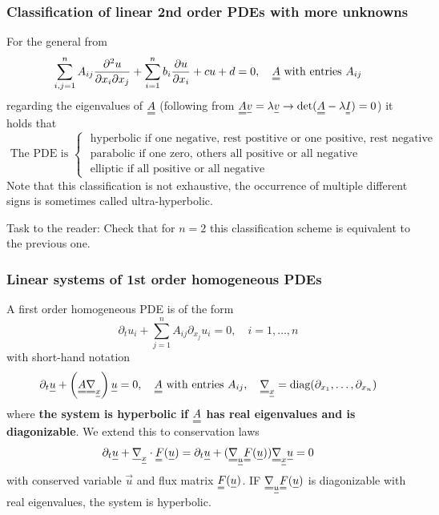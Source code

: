 \subsubsection{Classification of linear 2nd order PDEs with more unknowns}
For the general from
\begin{equation}
    \sum_{i, j=1}^n A_{i j} \frac{\partial^2 u}{\partial x_i \partial x_j}+\sum_{i=1}^n b_i \frac{\partial u}{\partial x_i}+c u+d=0, \quad \mat{A} \text { with entries } A_{i j}
\end{equation}
regarding the eigenvalues of $\mat{A}$ (following from $\mat{A}\vec{v} = \lambda \vec{v} \rightarrow \det(\mat{A}-\lambda \mat{I}) = 0$) it holds that
\begin{equation}
    \text { The PDE is }\left\{\begin{array}{c}
    \text { hyperbolic if one negative, rest postitive or one positive, rest negative } \\
    \text { parabolic if one zero, others all positive or all negative } \\
    \text { elliptic if all positive or all negative }
    \end{array}\right.
\end{equation}
Note that this classification is not exhaustive, the occurrence of multiple different signs is sometimes called ultra-hyperbolic.

Task to the reader: Check that for $n=2$ this classification scheme is equivalent to the previous one.

\subsubsection{Linear systems of 1st order homogeneous PDEs}
A first order homogeneous PDE is of the form
\begin{equation}
    \partial_t u_i + \sum_{j=1}^n A_{i j} \partial_{x_j} u_i = 0, \quad i = 1, \dots, n
\end{equation}
with short-hand notation
\begin{equation}
    \partial_t \vec{u} + \left(\mat{A} \mat{\nabla}_\vec{x} \right) \vec{u} = 0, \quad \mat{A} \text { with entries } A_{i j}, \quad \mat{\nabla}_\vec{x} = \text{diag}(\partial_{x_1}, \dots, \partial_{x_n})
\end{equation}
where \textbf{the system is hyperbolic if $\mat{A}$ has real eigenvalues and is diagonizable}.
We extend this to conservation laws
\begin{equation}
    \partial_t \vec{u} + \vec{\nabla}_\vec{x} \cdot \mat{F}(\vec{u}) = \partial_t \vec{u} + (\mat{\nabla}_\vec{u} \mat{F}(\vec{u})) \mat{\nabla}_\vec{x} \vec{u} = 0
\end{equation}
with conserved variable $\vec{u}$ and flux matrix $\mat{F}(\vec{u})$. IF $\mat{\nabla}_\vec{u} \mat{F}(\vec{u})$ is diagonizable with real eigenvalues, the system is hyperbolic.

